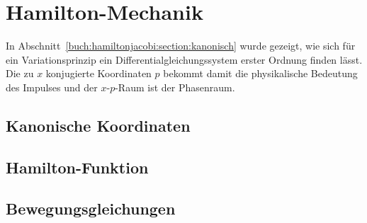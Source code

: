 %
%
%
\section{Hamilton-Mechanik
\label{buch:mechanik:section:legendre}}
In Abschnitt~\ref{buch:hamiltonjacobi:section:kanonisch} wurde gezeigt,
wie sich für ein Variationsprinzip ein Differentialgleichungssystem
erster Ordnung finden lässt.
Die zu $x$ konjugierte Koordinaten $p$ bekommt damit die physikalische
Bedeutung des Impulses und der $x$-$p$-Raum ist der Phasenraum.

%
%
\subsection{Kanonische Koordinaten}

%
%
\subsection{Hamilton-Funktion}

%
%
\subsection{Bewegungsgleichungen}

